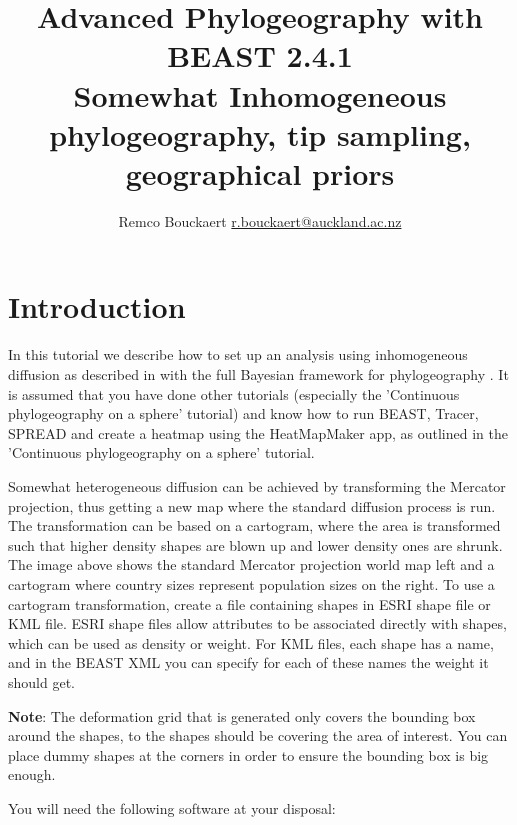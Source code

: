 \documentclass{article}
\newcommand{\BEASTVersion}{2.4.1}
\begin{document}
\title{Advanced Phylogeography with BEAST \BEASTVersion\\
    {\small Somewhat Inhomogeneous phylogeography, tip sampling, geographical priors}}
\author{Remco Bouckaert \url{r.bouckaert@auckland.ac.nz}}
\maketitle

\section{Introduction}


In this tutorial we describe how to set up an analysis using inhomogeneous diffusion as described in  \cite{somewhatIP} with the full Bayesian framework for phylogeography \cite{sphericalgeo}. It is assumed that you have done other tutorials (especially the 'Continuous phylogeography on a sphere' tutorial) and know how to run BEAST, Tracer, SPREAD and create a heatmap using the HeatMapMaker app, as outlined in the 'Continuous phylogeography on a sphere' tutorial.

Somewhat heterogeneous diffusion can be achieved by transforming the Mercator projection, thus getting a new map where the standard diffusion process is run. The transformation can be based on a cartogram, where the area is transformed such that higher density shapes are blown up and lower density ones are shrunk. The image above shows the standard Mercator projection world map left and a cartogram where country sizes represent population sizes on the right. To use a cartogram transformation, create a file containing shapes in ESRI shape file or KML file. ESRI shape files allow attributes to be associated directly with shapes, which can be used as density or weight. For KML files, each shape has a name, and in the BEAST XML you can specify for each of these names the weight it should get.

{\bf Note}: The deformation grid that is generated only covers the bounding box around the shapes, to the shapes should be covering the area of interest. You can place dummy shapes at the corners in order to ensure the bounding box is big enough.

You will need the following software at your disposal:
\end{document}
